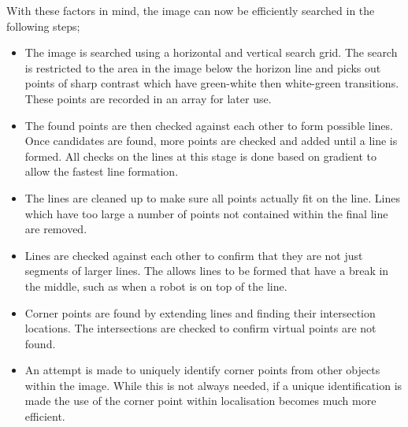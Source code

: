 With these factors in mind, the image can now be efficiently searched in the following steps;
\begin{itemize}

\item The image is searched using a horizontal and vertical search grid. The search is restricted to the area in the image below the horizon line and picks out points of sharp contrast which have green-white then white-green transitions. These points are recorded in an array for later use.

\item The found points are then checked against each other to form possible lines. Once candidates are found, more points are checked and added until a line is formed. All checks on the lines at this stage is done based on gradient to allow the fastest line formation.

\item The lines are cleaned up to make sure all points actually fit on the line. Lines which have too large a number of points not contained within the final line are removed.

\item Lines are checked against each other to confirm that they are not just segments of larger lines. The allows lines to be formed that have a break in the middle, such as when a robot is on top of the line.

\item Corner points are found by extending lines and finding their intersection locations. The intersections are checked to confirm virtual points are not found. 

\item An attempt is made to uniquely identify corner points from other objects within the image. While this is not always needed, if a unique identification is made the use of the corner point within localisation becomes much more efficient.

\end{itemize}

